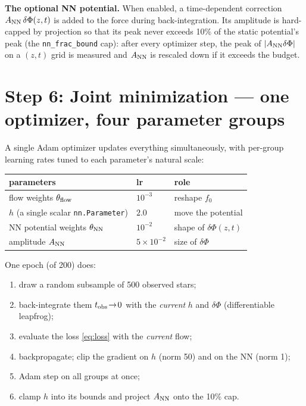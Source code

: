 \documentclass[11pt]{article}
\begin{document}
\textbf{The optional NN potential.} When enabled, a time-dependent correction
$A_{\rm NN}\,\delta\Phi(z,t)$ is added to the force during back-integration. Its
amplitude is hard-capped by projection so that its peak never exceeds 10\% of the
static potential's peak (the \texttt{nn\_frac\_bound} cap): after every optimizer step,
the peak of $|A_{\rm NN}\delta\Phi|$ on a $(z,t)$ grid is measured and $A_{\rm NN}$ is
rescaled down if it exceeds the budget.

\section{Step 6: Joint minimization --- one optimizer, four parameter groups}

A single Adam optimizer updates everything simultaneously, with per-group learning
rates tuned to each parameter's natural scale:

\begin{center}
\begin{tabular}{l l l}
\textbf{parameters} & \textbf{lr} & \textbf{role} \\ \hline
flow weights $\theta_{\rm flow}$ & $10^{-3}$ & reshape $f_0$ \\
$h$ (a single scalar \texttt{nn.Parameter}) & $2.0$ & move the potential \\
NN potential weights $\theta_{\rm NN}$ & $10^{-2}$ & shape of $\delta\Phi(z,t)$ \\
amplitude $A_{\rm NN}$ & $5\times10^{-2}$ & size of $\delta\Phi$ \\
\end{tabular}
\end{center}

One epoch (of 200) does:
\begin{enumerate}[label=\arabic*.]
\item draw a random subsample of 500 observed stars;
\item back-integrate them $t_{\rm obs}\!\to\!0$ with the \emph{current} $h$ and
      $\delta\Phi$ (differentiable leapfrog);
\item evaluate the loss \eqref{eq:loss} with the \emph{current} flow;
\item backpropagate; clip the gradient on $h$ (norm 50) and on the NN (norm 1);
\item Adam step on all groups at once;
\item clamp $h$ into its bounds and project $A_{\rm NN}$ onto the 10\% cap.
\end{enumerate}
\end{document}
